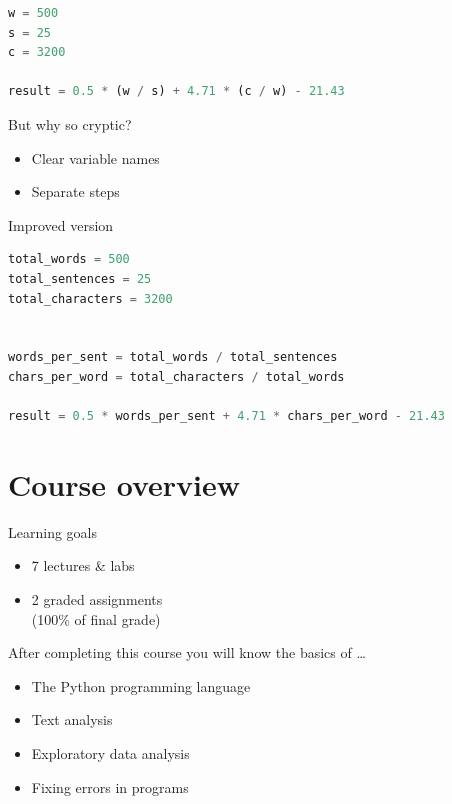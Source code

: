 \documentclass[aspectratio=169,usenames,dvipsnames]{beamer}
\begin{document}
\begin{frame}[fragile]
\begin{lstlisting}[language=python]
w = 500
s = 25
c = 3200

result = 0.5 * (w / s) + 4.71 * (c / w) - 21.43
\end{lstlisting}

\pause But why so cryptic?

\begin{itemize}
    \item Clear variable names
    \item Separate steps
\end{itemize}
\end{frame}

\begin{frame}[fragile]{Improved version}
\begin{lstlisting}[language=python]
total_words = 500
total_sentences = 25
total_characters = 3200


words_per_sent = total_words / total_sentences
chars_per_word = total_characters / total_words

result = 0.5 * words_per_sent + 4.71 * chars_per_word - 21.43
\end{lstlisting}
\end{frame}



\section{Course overview}
\frame{\tableofcontents[currentsection]}

\begin{frame}{Learning goals}
    \begin{itemize}
       \item 7 lectures \& labs
       \item 2 graded assignments \\
           (100\% of final grade)
    \end{itemize}
    After completing this course you will know the basics of \dots
    \begin{itemize}
       \item The Python programming language
       \item Text analysis
       \item Exploratory data analysis
       \item Fixing errors in programs
    \end{itemize}
\end{frame}
\end{document}
